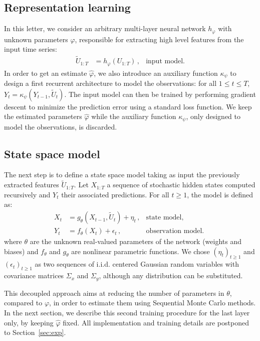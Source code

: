 \documentclass[journal]{IEEEtran}
\begin{document}
\subsection{Representation learning}%
In this letter, we consider an arbitrary multi-layer neural network $h_\varphi$ with unknown parameters $\varphi$, responsible for extracting high level features from the input time series:
\begin{align*}
	\widetilde U_{1:T} & = h_\varphi(U_{1:T})\,, & \text{input model.}
\end{align*}
In order to get an estimate $\hat \varphi$, we also introduce an auxiliary function $\kappa_\psi$ to design a first recurrent architecture to model the observations: for all $1 \leq t \leq T$, $Y_t = \kappa_\psi(Y_{t-1}, \widetilde U_t)$.
The input model can then be trained by performing gradient descent to minimize the prediction error using a standard loss function.
We keep the estimated parameters $\hat \varphi$ while the auxiliary function $\kappa_\psi$, only designed to model the observations, is discarded.

\subsection{State space model}
\label{sub:proposed_architecture}
The next step is to define  a state space model taking as input the previously extracted features $\widetilde U_{1:T}$.
Let $X_{1:T}$ a sequence of stochastic hidden states computed recursively and $Y_t$ their associated predictions.
For all $t \geq 1$, the model is defined as:
\begin{align*}
	X_t & = g_\theta(X_{t-1}, \widetilde U_t) + \eta_t\,, & \text{state model, }       \\
	Y_t & = f_\theta(X_t) + \epsilon_t\,,                 & \text{observation model. }
\end{align*}
where $\theta$ are the unknown real-valued parameters of the network (weights and biases) and $f_\theta$ and $g_\theta$ are nonlinear parametric functions.
We chose $(\eta_t)_{t\geq 1}$ and $(\epsilon_t)_{t\geq 1}$ as two sequences of i.i.d. centered Gaussian random variables with covariance matrices $\Sigma_x$ and $\Sigma_y$, although any distribution can be substituted.

This decoupled approach aims at reducing the number of parameters in $\theta$, compared to $\varphi$, in order to estimate them using Sequential Monte Carlo methods.
In the next section, we describe this second training procedure for the last layer only, by keeping $\hat \varphi$ fixed.
All implementation and training details are postponed to Section~\ref{sec:exp}.
\end{document}
